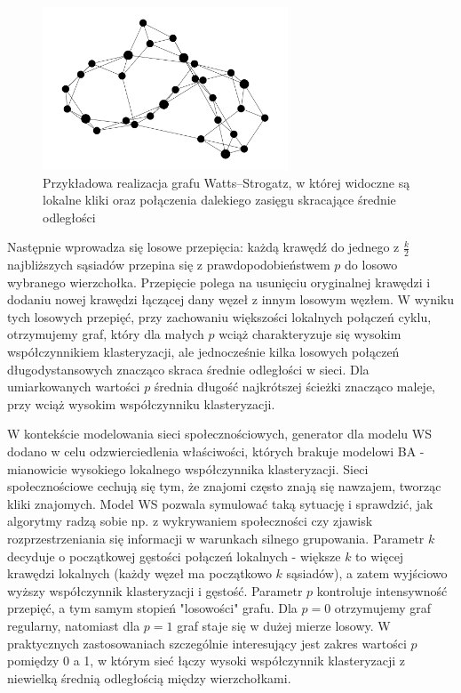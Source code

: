 \begin{figure}[h]
  \centering
  \includegraphics[width=0.65\textwidth]{assets/test_data/smallworld.png}
  \caption{Przykładowa realizacja grafu Watts--Strogatz, w której widoczne są lokalne kliki oraz połączenia dalekiego zasięgu skracające średnie odległości}
  \label{fig:WS}
\end{figure}

Następnie wprowadza się losowe przepięcia: każdą krawędź do jednego z $\tfrac{k}{2}$ najbliższych sąsiadów przepina się z prawdopodobieństwem $p$ do losowo wybranego wierzchołka. Przepięcie polega na usunięciu oryginalnej krawędzi i dodaniu nowej krawędzi łączącej dany węzeł z innym losowym węzłem. W wyniku tych losowych przepięć, przy zachowaniu większości lokalnych połączeń cyklu, otrzymujemy graf, który dla małych $p$ wciąż charakteryzuje się wysokim współczynnikiem klasteryzacji, ale jednocześnie kilka losowych połączeń długodystansowych znacząco skraca średnie odległości w sieci.
Dla umiarkowanych wartości $p$ średnia długość najkrótszej ścieżki znacząco maleje, przy wciąż wysokim współczynniku klasteryzacji.

W kontekście modelowania sieci społecznościowych, generator dla modelu WS dodano w celu odzwierciedlenia właściwości, których brakuje modelowi BA - mianowicie wysokiego lokalnego współczynnika klasteryzacji. Sieci społecznościowe cechują się tym, że znajomi często znają się nawzajem, tworząc kliki znajomych. Model WS pozwala symulować taką sytuację i sprawdzić, jak algorytmy radzą sobie np. z wykrywaniem społeczności czy zjawisk rozprzestrzeniania się informacji w warunkach silnego grupowania. Parametr $k$ decyduje o początkowej gęstości połączeń lokalnych - większe $k$ to więcej krawędzi lokalnych (każdy węzeł ma początkowo $k$ sąsiadów), a zatem wyjściowo wyższy współczynnik klasteryzacji i gęstość. Parametr $p$ kontroluje intensywność przepięć, a tym samym stopień "losowości" grafu.
Dla $p=0$ otrzymujemy graf regularny, natomiast dla $p=1$ graf staje się w dużej mierze losowy.
W praktycznych zastosowaniach szczególnie interesujący jest zakres wartości $p$ pomiędzy 0 a 1, w którym sieć łączy wysoki współczynnik klasteryzacji z niewielką średnią odległością między wierzchołkami.


